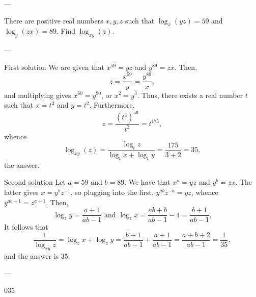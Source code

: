 
---

There are positive real numbers $x,y,z$ such that $\log_x(yz)=59$ and $\log_y(zx)=89$. Find $\log_{xy}(z)$.

---

\begin{customenv}{First solution}
    We are given that $x^{59}=yz$ and $y^{89}=zx$. Then, \[z=\frac{x^{59}}y=\frac{y^{89}}x,\]
    and multiplying gives  $x^{60}=y^{90}$, or $x^2=y^3$. Thus, there exists a real number $t$ such that $x=t^3$ and $y=t^2$. Furthermore, \[z=\frac{(t^3)^{59}}{t^2}=t^{175},\]
    whence \[\log_{xy}(z)=\frac{\log_t z}{\log_t x+\log_t y}=\frac{175}{3+2}=35,\]
    the answer.
\end{customenv}
\begin{customenv}{Second solution}
    Let $a=59$ and $b=89$. We have that $x^a=yz$ and $y^b=zx$. The latter gives $x=y^bz^{-1}$, so plugging into the first, $y^{ab}z^{-a}=yz$, whence $y^{ab-1}=z^{a+1}$. Then, \[\log_z y=\frac{a+1}{ab-1}\text{ and }\log_z x=\frac{ab+b}{ab-1}-1=\frac{b+1}{ab-1}.\] It follows that \[\frac1{\log_{xy} z}=\log_z x+\log_z y=\frac{b+1}{ab-1}+\frac{a+1}{ab-1}=\frac{a+b+2}{ab-1}=\frac1{35},\]and the answer is $35$.
\end{customenv}

---

035
